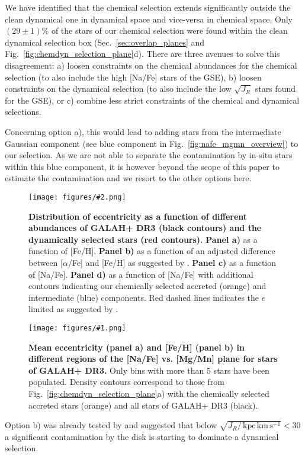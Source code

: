 \documentclass[fleqn,usenatbib]{mnras}
\newcommand{\kpckms}{\,\mathrm{kpc\,km\,s^{-1}}}	%
\newcommand{\codeicon}{{\faCloudDownload}}
\newcommand{\codelink}[1]{\href{https://github.com/svenbuder/buder_galah_accreted_chemistry/tree/main/figures/#1.ipynb}{\codeicon}\,\,}
\newcommand{\oscaption}[2]{\caption{#2 \codelink{#1}}}
\newcommand{\figuretextwidth}[4]{\begin{figure*} \centering \texttt{[image: figures/\#2.png]}\oscaption{#3}{#4}\label{fig:#2} \end{figure*}}
\newcommand{\figurecolumnwidth}[3]{\begin{figure} \centering \texttt{[image: figures/\#1.png]}\oscaption{#2}{#3}\label{fig:#1} \end{figure}}
\begin{document}
We have identified that the chemical selection extends significantly outside the clean dynamical one in dynamical space and vice-versa in chemical space. Only $(29\pm1)\%$ of the stars of our chemical selection were found within the clean dynamical selection box (Sec.~\ref{sec:overlap_planes} and Fig.~\ref{fig:chemdyn_selection_plane}d). There are three avenues to solve this disagreement:
a) loosen constraints on the chemical abundances for the chemical selection (to also include the high [Na/Fe] stars of the GSE), 
b) loosen constraints on the dynamical selection (to also include the low $\sqrt{J_R}$ stars found for the GSE), or 
c) combine less strict constraints of the chemical and dynamical selections.

Concerning option a), this would lead to adding stars from the intermediate Gaussian component (see blue component in Fig.~\ref{fig:nafe_mgmn_overview}) to our selection. As we are not able to separate the contamination by in-situ stars within this blue component, it is however beyond the scope of this paper to estimate the contamination and we resort to the other options here.

\figuretextwidth{17cm}{nafe_e}{chronochemodynamic_comparison}{
\textbf{Distribution of eccentricity as a function of different abundances of GALAH+ DR3 (black contours) and the dynamically selected stars (red contours).}
\textbf{Panel a)} as a function of [Fe/H].
\textbf{Panel b)} as a function of an adjusted difference between [$\alpha$/Fe] and [Fe/H] as suggested by \citet{Naidu2020}.
\textbf{Panel c)} as a function of [Na/Fe].
\textbf{Panel d)} as a function of [Na/Fe] with additional contours indicating our chemically selected accreted (orange) and intermediate (blue) components.
Red dashed lines indicates the $e$ limited as suggested by \citet{Naidu2020}.
}

\figurecolumnwidth{NaFe_MgMn_Fe_H_ecc}{chronochemodynamic_comparison}{
\textbf{Mean eccentricity (panel a) and [Fe/H] (panel b) in different regions of the [Na/Fe] vs. [Mg/Mn] plane for stars of GALAH+ DR3.}
Only bins with more than 5 stars have been populated.
Density contours correspond to those from Fig.~\ref{fig:chemdyn_selection_plane}a) with the chemically selected accreted stars (orange) and all stars of GALAH+ DR3 (black).
}

Option b) was already tested by \citet{Feuillet2020} and suggested that below $\sqrt{J_R / \kpckms} < 30$ a significant contamination by the disk is starting to dominate a dynamical selection.
\end{document}

